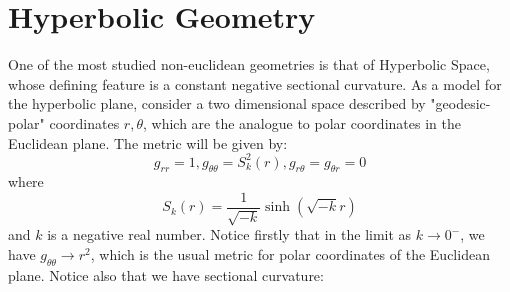 \documentclass[12pt]{article}
\begin{document}
\section{Hyperbolic Geometry}
One of the most studied non-euclidean geometries is that of Hyperbolic Space, whose defining feature is a constant negative sectional curvature. As a model for the hyperbolic plane, consider a two dimensional space described by "geodesic-polar" coordinates $r, \theta$, which are the analogue to polar coordinates in the Euclidean plane. The metric will be given by:
$$g_{rr} = 1, g_{\theta \theta} = S_k^2(r), g_{r \theta} = g_{\theta r} = 0$$
where
$$S_k(r) = \frac{1}{\sqrt{-k}} \sinh(\sqrt{-k} r)$$
and $k$ is a negative real number. Notice firstly that in the limit as $k \to 0^-$, we have $g_{\theta \theta} \to r^2$, which is the usual metric for polar coordinates of the Euclidean plane. Notice also that we have sectional curvature:
$$
\end{document}
